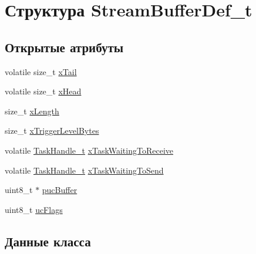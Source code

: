 \hypertarget{struct_stream_buffer_def__t}{}\section{Структура Stream\+Buffer\+Def\+\_\+t}
\label{struct_stream_buffer_def__t}
\subsection*{Открытые атрибуты}
\begin{DoxyCompactItemize}
\item 
volatile size\+\_\+t \mbox{\hyperlink{struct_stream_buffer_def__t_a937e441ed6c946a099d52b5955d7302c}{x\+Tail}}
\item 
volatile size\+\_\+t \mbox{\hyperlink{struct_stream_buffer_def__t_a75aafb9fdee8f0666837302bd9b12341}{x\+Head}}
\item 
size\+\_\+t \mbox{\hyperlink{struct_stream_buffer_def__t_a6eedf41c877edd42b3b460780d1b6555}{x\+Length}}
\item 
size\+\_\+t \mbox{\hyperlink{struct_stream_buffer_def__t_a4a7ee9b374cc0b358d049811def8d595}{x\+Trigger\+Level\+Bytes}}
\item 
volatile \mbox{\hyperlink{task_8h_a25b35e6e19ecf894173e7ff95edb96ef}{Task\+Handle\+\_\+t}} \mbox{\hyperlink{struct_stream_buffer_def__t_a8377ae8625121efa22d66e678add4057}{x\+Task\+Waiting\+To\+Receive}}
\item 
volatile \mbox{\hyperlink{task_8h_a25b35e6e19ecf894173e7ff95edb96ef}{Task\+Handle\+\_\+t}} \mbox{\hyperlink{struct_stream_buffer_def__t_a85b1cf05c0222f8d67a64f7d01722e52}{x\+Task\+Waiting\+To\+Send}}
\item 
uint8\+\_\+t $\ast$ \mbox{\hyperlink{struct_stream_buffer_def__t_a4e05054a8a3d61a5cec0c18a70bbdb67}{puc\+Buffer}}
\item 
uint8\+\_\+t \mbox{\hyperlink{struct_stream_buffer_def__t_a1afd02d997a1cb3149e3cf203c681d58}{uc\+Flags}}
\end{DoxyCompactItemize}


\subsection{Данные класса}
\mbox{\label{struct_stream_buffer_def__t_a4e05054a8a3d61a5cec0c18a70bbdb67}} 
